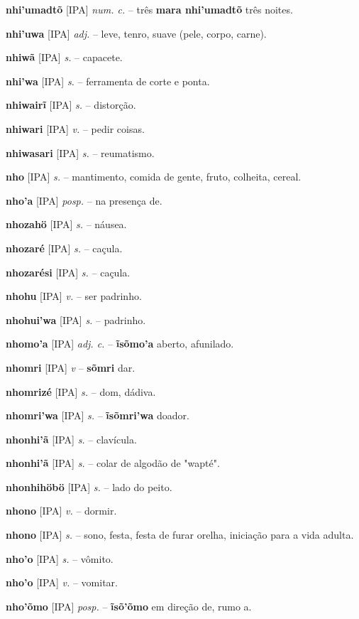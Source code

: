 \textbf{nhi'umadtõ} [IPA] \textit{num. c.} -- três  \textbf{mara nhi'umadtõ} três noites.

\textbf{nhi'uwa} [IPA] \textit{adj.} -- leve, tenro, suave (pele, corpo, carne).

\textbf{nhiwã} [IPA] \textit{s.} -- capacete.

\textbf{nhi'wa} [IPA] \textit{s.} -- ferramenta de corte e ponta.

\textbf{nhiwairĩ} [IPA] \textit{s.} -- distorção.

\textbf{nhiwari} [IPA] \textit{v.} -- pedir coisas.

\textbf{nhiwasari} [IPA] \textit{s.} -- reumatismo.

\textbf{nho} [IPA] \textit{s.} -- mantimento, comida de gente, fruto, colheita, cereal.

\textbf{nho'a} [IPA] \textit{posp.} -- na presença de.

\textbf{nhozahö} [IPA] \textit{s.} -- náusea.

\textbf{nhozaré} [IPA] \textit{s.} -- caçula.

\textbf{nhozarési} [IPA] \textit{s.} -- caçula.

\textbf{nhohu} [IPA] \textit{v.} -- ser padrinho.

\textbf{nhohui'wa} [IPA] \textit{s.} -- padrinho.

\textbf{nhomo'a} [IPA] \textit{adj. c.} -- \textbf{ĩsõmo'a} aberto, afunilado.

\textbf{nhomri} [IPA] \textit{v} -- \textbf{sõmri} dar.

\textbf{nhomrizé} [IPA] \textit{s.} -- dom, dádiva.

\textbf{nhomri'wa} [IPA] \textit{s.} -- \textbf{ĩsõmri'wa} doador.

\textbf{nhonhi'ã} [IPA] \textit{s.} -- clavícula.

\textbf{nhonhi'ã} [IPA] \textit{s.} -- colar de algodão de "wapté".

\textbf{nhonhihöbö} [IPA] \textit{s.} -- lado do peito.

\textbf{nhono} [IPA] \textit{v.} -- dormir.

\textbf{nhono} [IPA] \textit{s.} -- sono, festa, festa de furar orelha, iniciação para a vida adulta.

\textbf{nho'o} [IPA] \textit{s.} -- vômito.

\textbf{nho'o} [IPA] \textit{v.} -- vomitar.

\textbf{nho'õmo} [IPA] \textit{posp.} -- \textbf{ĩsõ'õmo} em direção de, rumo a.

